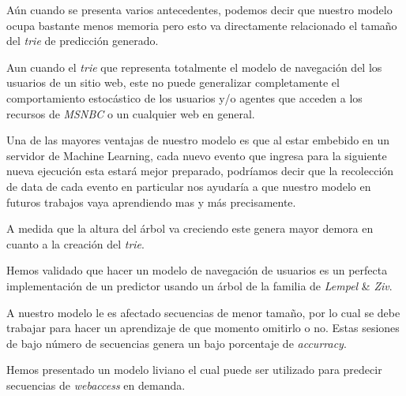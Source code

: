 Aún cuando se presenta varios antecedentes, podemos decir que nuestro modelo ocupa bastante menos memoria pero esto va directamente relacionado el tamaño del \emph{trie} de predicción generado.

%
Aun cuando el \emph{trie} que representa totalmente el modelo de navegación del los usuarios de un sitio web, este no puede generalizar completamente el comportamiento estocástico de los usuarios y/o agentes que acceden a los recursos de \emph{MSNBC} o un cualquier web en general.

Una de las mayores ventajas de nuestro modelo es que al estar embebido en un servidor de Machine Learning, cada nuevo evento que ingresa para la siguiente nueva ejecución esta estará mejor preparado, podríamos decir que la recolección de data de cada evento en particular nos ayudaría a que nuestro modelo en futuros trabajos vaya aprendiendo mas y más precisamente.


A medida que la altura del árbol va creciendo este genera mayor demora en cuanto a la creación del \emph{trie}.

Hemos validado que hacer un modelo de navegación de usuarios es un perfecta implementación de un predictor usando un árbol de la familia de \emph{Lempel} \& \emph{Ziv}.

A nuestro modelo le es afectado secuencias de menor tamaño, por lo cual se debe trabajar para hacer un aprendizaje de que momento omitirlo o no. Estas sesiones de bajo número de secuencias genera un bajo porcentaje de \emph{accurracy}. 



Hemos presentado un modelo liviano el cual puede ser utilizado para predecir secuencias de \emph{webaccess} en demanda.










